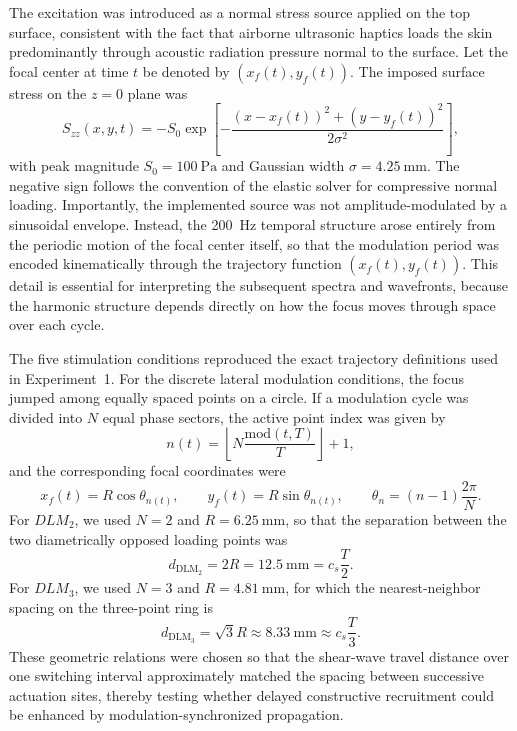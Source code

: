 \documentclass[pdflatex, sn-nature]{sn-jnl}
\theoremstyle{thmstyleone}%
\theoremstyle{thmstyletwo}%
\theoremstyle{thmstylethree}%
\begin{document}
The excitation was introduced as a normal stress source applied on the top surface, consistent with the fact that airborne ultrasonic haptics loads the skin predominantly through acoustic radiation pressure normal to the surface. Let the focal center at time $t$ be denoted by $(x_f(t),y_f(t))$. The imposed surface stress on the $z=0$ plane was
\begin{equation}
    S_{zz}(x,y,t) = -S_0 \exp\!\left[-\frac{(x-x_f(t))^2+(y-y_f(t))^2}{2\sigma^2}\right],
\end{equation}
with peak magnitude $S_0=\qty{100}{\pascal}$ and Gaussian width $\sigma=\qty{4.25}{\milli\meter}$. The negative sign follows the convention of the elastic solver for compressive normal loading. Importantly, the implemented source was not amplitude-modulated by a sinusoidal envelope. Instead, the \qty{200}{\hertz} temporal structure arose entirely from the periodic motion of the focal center itself, so that the modulation period was encoded kinematically through the trajectory function $(x_f(t),y_f(t))$. This detail is essential for interpreting the subsequent spectra and wavefronts, because the harmonic structure depends directly on how the focus moves through space over each cycle.

The five stimulation conditions reproduced the exact trajectory definitions used in Experiment~1. For the discrete lateral modulation conditions, the focus jumped among equally spaced points on a circle. If a modulation cycle was divided into $N$ equal phase sectors, the active point index was given by
\begin{equation}
    n(t)=\left\lfloor N\frac{\mathrm{mod}(t,T)}{T}\right\rfloor+1,
\end{equation}
and the corresponding focal coordinates were
\begin{equation}
    x_f(t)=R\cos\theta_{n(t)},
    \qquad
    y_f(t)=R\sin\theta_{n(t)},
    \qquad
    \theta_n = (n-1)\frac{2\pi}{N}.
\end{equation}
For $DLM_2$, we used $N=2$ and $R=\qty{6.25}{\milli\meter}$, so that the separation between the two diametrically opposed loading points was
\begin{equation}
    d_{\mathrm{DLM_2}} = 2R = \qty{12.5}{\milli\meter} = c_s\frac{T}{2}.
\end{equation}
For $DLM_3$, we used $N=3$ and $R=\qty{4.81}{\milli\meter}$, for which the nearest-neighbor spacing on the three-point ring is
\begin{equation}
    d_{\mathrm{DLM_3}} = \sqrt{3}R \approx \qty{8.33}{\milli\meter} \approx c_s\frac{T}{3}.
\end{equation}
These geometric relations were chosen so that the shear-wave travel distance over one switching interval approximately matched the spacing between successive actuation sites, thereby testing whether delayed constructive recruitment could be enhanced by modulation-synchronized propagation.
\end{document}
